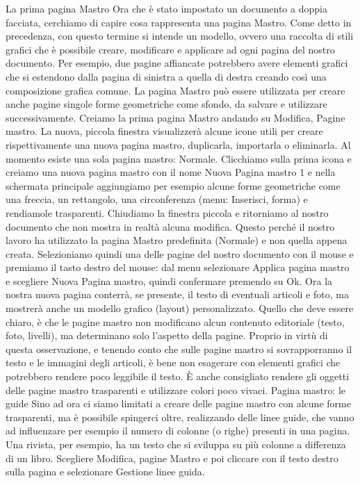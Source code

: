 \documentclass[a4paper, 12pt]{book}
\begin{document}
La prima pagina Mastro
Ora che è stato impostato un documento a doppia facciata, cerchiamo di capire cosa rappresenta una pagina Mastro. Come detto in precedenza, con questo termine si intende un modello, ovvero una raccolta di stili grafici che è possibile creare, modificare e applicare ad ogni pagina del nostro documento. Per esempio, due pagine affiancate potrebbero avere elementi grafici che si estendono dalla pagina di sinistra a quella di destra creando così una composizione grafica comune. La pagina Mastro può essere utilizzata per creare anche pagine singole forme geometriche come sfondo, da salvare e utilizzare successivamente. 
Creiamo la prima pagina Mastro andando su Modifica, Pagine mastro. La nuova, piccola finestra visualizzerà alcune icone utili per creare rispettivamente una nuova pagina mastro, duplicarla, importarla o eliminarla. 
Al momento esiste una sola pagina mastro: Normale. Clicchiamo sulla prima icona e creiamo una nuova pagina mastro con il nome Nuova Pagina mastro 1 e nella schermata principale aggiungiamo per esempio alcune forme geometriche come una freccia, un rettangolo, una circonferenza (menu: Inserisci, forma) e rendiamole trasparenti. 
Chiudiamo la finestra piccola e ritorniamo al nostro documento che non mostra in realtà alcuna modifica. Questo perché  il nostro lavoro ha utilizzato la pagina Mastro predefinita (Normale) e non quella appena creata. 
Selezioniamo quindi una delle pagine del nostro documento con il mouse e premiamo il tasto destro del mouse: dal menu selezionare Applica pagina mastro e scegliere Nuova Pagina mastro, quindi confermare premendo su Ok. 
Ora la nostra nuova pagina conterrà, se presente, il testo di eventuali articoli e foto, ma mostrerà anche un modello grafico (layout) personalizzato. Quello che deve essere chiaro, è che le pagine mastro non modificano alcun contenuto editoriale (testo, foto, livelli), ma determinano solo l'aspetto della pagine. Proprio in virtù di questa osservazione, e tenendo conto che sulle pagine mastro si sovrapporranno il testo e le immagini degli articoli, è bene non esagerare con elementi grafici che potrebbero rendere poco leggibile il testo. È anche consigliato rendere gli oggetti delle pagine mastro trasparenti e utilizzare colori poco vivaci.
Pagina mastro: le guide
Sino ad ora ci siamo limitati a creare delle pagine mastro con alcune forme trasparenti, ma è possibile spingerci oltre, realizzando delle linee guide, che vanno ad influenzare per esempio il numero di colonne (o righe) presenti in una pagina. Una rivista, per esempio, ha un testo che si sviluppa su più colonne a differenza di un libro. Scegliere Modifica, pagine Mastro e poi cliccare con il testo destro sulla pagina e selezionare Gestione linee guida.
\end{document}
